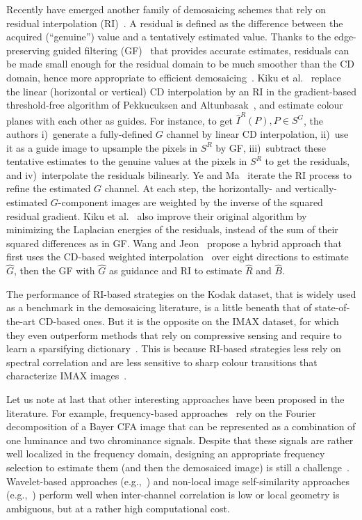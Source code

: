 \documentclass[twoside]{article}
\begin{document}
Recently have emerged another family of demosaicing schemes that rely on residual interpolation (RI)~\cite{kiku_icip_2013}. A residual is defined as the difference between the acquired (``genuine'') value and a tentatively estimated value. Thanks to the edge-preserving guided filtering (GF)~\cite{he_pami_2013} that provides accurate estimates, residuals can be made small enough for the residual domain to be much smoother than the CD domain, hence more appropriate to efficient demosaicing~\cite{ye_ip_2015}. Kiku et al.~\cite{kiku_icip_2013} replace the linear (horizontal or vertical) CD interpolation by an RI in the gradient-based threshold-free algorithm of Pekkucuksen and Altunbasak~\cite{pekkucuksen_ip_2013}, and estimate colour planes with each other as guides. For instance, to get $\hat{I}^R(P), P \in S^G$, the authors i)~generate a fully-defined $G$ channel by linear CD interpolation, ii)~use it as a guide image to upsample the pixels in $S^R$ by GF, iii)~subtract these tentative estimates to the genuine values at the pixels in $S^R$ to get the residuals, and iv)~interpolate the residuals bilinearly. Ye and Ma~\cite{ye_ip_2015} iterate the RI process to refine the estimated $G$ channel. At each step, the horizontally- and vertically-estimated $G$-component images are weighted by the inverse of the squared residual gradient. Kiku et al.~\cite{kiku_spie_2014,kiku_ip_2016} also improve their original algorithm by minimizing the Laplacian energies of the residuals, instead of the sum of their squared differences as in GF. Wang and Jeon~\cite{wang_spl_2015} propose a hybrid approach that first uses the CD-based weighted interpolation~\cite{chen_csvt_2015} over eight directions to estimate $\hat{G}$, then the GF with $\hat{G}$ as guidance and RI to estimate $\hat{R}$ and $\hat{B}$.

The performance of RI-based strategies on the Kodak dataset, that is widely used as a benchmark in the demosaicing literature, is a little beneath that of state-of-the-art CD-based ones. But it is the opposite on the IMAX dataset, for which they even outperform methods that rely on compressive sensing and require to learn a sparsifying dictionary~\cite{mairal_iccv_2009,moghadam_ip_2013,rossi_icip_2014}. This is because RI-based strategies less rely on spectral correlation and are less sensitive to sharp colour transitions that characterize IMAX images~\cite{duran_ip_2014}.

Let us note at last that other interesting approaches have been proposed in the literature. For example, frequency-based approaches~\cite{alleysson_spie_2008} rely on the Fourier decomposition of a Bayer CFA image that can be represented as a combination of one luminance and two chrominance signals. Despite that these signals are rather well localized in the frequency domain, designing an appropriate frequency selection to estimate them (and then the demosaiced image) is still a challenge~\cite{dubois_spl_2005,leung_ip_2011}. Wavelet-based approaches (e.g.,~\cite{liang_ipi_2013,korneliussen_ip_2014}) and non-local image self-similarity approaches (e.g.,~\cite{duran_ip_2014}) perform well when inter-channel correlation is low or local geometry is ambiguous, but at a rather high computational cost.
\end{document}
